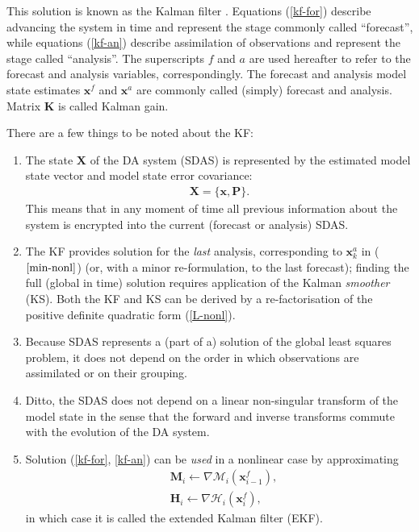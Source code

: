 \documentclass[11pt]{report}
\newcommand{\mb} {\mathbf}
\begin{document}
This solution is known as the Kalman filter \citep[KF,][]{kal60}.
Equations (\ref{kf-for}) describe advancing the system in time and represent the stage commonly called ``forecast'', while equations (\ref{kf-an}) describe assimilation of observations and represent the stage called ``analysis''.
The superscripts $f$ and $a$ are used hereafter to refer to the forecast and analysis variables, correspondingly.
The forecast and analysis model state estimates $\mb x^f$ and $\mb x^a$ are commonly called (simply) forecast and analysis.
Matrix $\mb K$ is called Kalman gain.

There are a few things to be noted about the KF:
\begin{enumerate}
\item The state $\mb X$ of the DA system (SDAS) is represented by the estimated model state vector and model state error covariance: 
\begin{align}
  \label{sdas}
  \mb X = \{\mb x, \mb P\}.
\end{align}
This means that in any moment of time all previous information about the system is encrypted into the current (forecast or analysis) SDAS.
\item The KF provides solution for the \emph{last} analysis, corresponding to $\mb x_k^a$ in ($\ref{min-nonl}$) (or, with a minor re-formulation, to the last forecast); finding the full (global in time) solution requires application of the Kalman \emph{smoother} (KS).
Both the KF and KS can be derived by a re-factorisation of the positive definite quadratic form (\ref{L-nonl}).
\item Because SDAS represents a (part of a) solution of the global least squares problem, it does not depend on the order in which observations are assimilated or on their grouping.
\item Ditto, the SDAS does not depend on a linear non-singular transform of the model state in the sense that the forward and inverse transforms commute with the evolution of the DA system.
\item Solution (\ref{kf-for}, \ref{kf-an}) can be \emph{used} in a nonlinear case by approximating
\begin{align*}
  &\mb M_{i} \leftarrow \nabla \mathcal M_i(\mb x_{i-1}^f),\\
  &\mb H_{i} \leftarrow \nabla \mathcal H_i(\mb x_i^f),
\end{align*}
in which case it is called the extended Kalman filter (EKF).
\end{enumerate}
\end{document}
